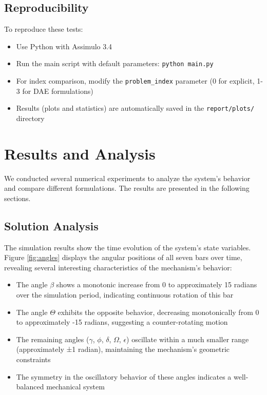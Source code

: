 \documentclass{article}
\begin{document}
\subsection{Reproducibility}
To reproduce these tests:
\begin{itemize}
    \item Use Python with Assimulo 3.4
    \item Run the main script with default parameters: \texttt{python main.py}
    \item For index comparison, modify the \texttt{problem\_index} parameter (0 for explicit, 1-3 for DAE formulations)
    \item Results (plots and statistics) are automatically saved in the \texttt{report/plots/} directory
\end{itemize}

\section*{Results and Analysis}
\indent

We conducted several numerical experiments to analyze the system's behavior and compare different formulations. The results are presented in the following sections.

\subsection{Solution Analysis}
\indent

The simulation results show the time evolution of the system's state variables. Figure \ref{fig:angles} displays the angular positions of all seven bars over time, revealing several interesting characteristics of the mechanism's behavior:

\begin{itemize}
    \item The angle $\beta$ shows a monotonic increase from 0 to approximately 15 radians over the simulation period, indicating continuous rotation of this bar
    \item The angle $\Theta$ exhibits the opposite behavior, decreasing monotonically from 0 to approximately -15 radians, suggesting a counter-rotating motion
    \item The remaining angles ($\gamma$, $\phi$, $\delta$, $\Omega$, $\epsilon$) oscillate within a much smaller range (approximately ±1 radian), maintaining the mechanism's geometric constraints
    \item The symmetry in the oscillatory behavior of these angles indicates a well-balanced mechanical system
\end{itemize}
\end{document}
